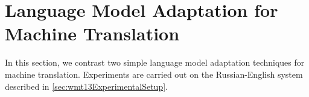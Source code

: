 % 




\section{Language Model Adaptation for Machine Translation}
\label{sec:domainAdaptationLM}

In this section, we contrast two simple language model adaptation
techniques for machine translation. Experiments are carried out %
on the Russian-English system described in \autoref{sec:wmt13ExperimentalSetup}.

